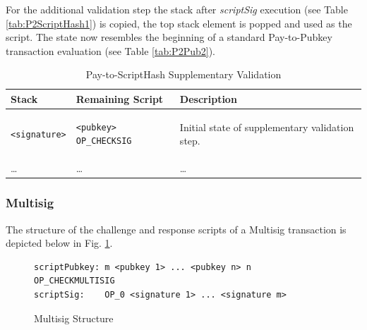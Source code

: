 \begin{table}[!ht]  
\begin{minipage}{\textwidth}
For the additional validation step the stack after \textit{scriptSig} execution (see Table \ref{tab:P2ScriptHash1}) is copied, the top stack element is popped and used as the script. The state now resembles the beginning of a standard Pay-to-Pubkey transaction evaluation (see Table \ref{tab:P2Pub2}).

\vspace{20pt}

\centering
\begin{tabular}{| m{105pt} | m{135pt} | m{100pt} |}
\hline
\textbf{Stack} & \textbf{Remaining Script} & \textbf{Description} \\ \hline \hline

\vspace{8pt}
\begin{BVerbatim}[fontsize==\relsize{-4}]
<signature>
\end{BVerbatim} 
\vspace{4pt}
&
\vspace{8pt}
\begin{BVerbatim}[fontsize==\relsize{-4}]
<pubkey> OP_CHECKSIG
\end{BVerbatim} 
\vspace{4pt}
&
Initial state of supplementary validation step.\\ \hline

\dots & \dots & \dots \\ \hline

\end{tabular}
\vspace{5pt}
\caption{Pay-to-ScriptHash Supplementary Validation}
\label{tab:P2ScriptHash3}
\end{minipage}
\end{table}

\clearpage
\subsubsection{Multisig}
The structure of the challenge and response scripts of a Multisig transaction is depicted below in Fig. \ref{fig:P2Multisig}.

\vspace{-10pt}
\begin{figure}[htbp]

\begin{Verbatim}[fontsize==\relsize{-4}, frame=single]  
scriptPubkey: m <pubkey 1> ... <pubkey n> n OP_CHECKMULTISIG
scriptSig:    OP_0 <signature 1> ... <signature m>
\end{Verbatim}

\vspace{-15pt}
\caption{Multisig Structure}
\label{fig:P2Multisig}
\end{figure}
\vspace{-10pt}

